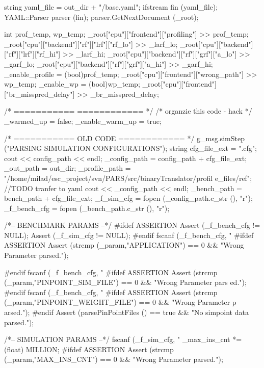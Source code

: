 \begin{DoxyCode}
                                                                     {
    string yaml_file = out_dir + "/base.yaml";
    ifstream fin (yaml_file);
    YAML::Parser parser (fin);
    parser.GetNextDocument (_root);


    int prof_temp, wp_temp;
    _root["cpu"]["frontend"]["profiling"] >> prof_temp;
    _root["cpu"]["backend"]["rf"]["lrf"]["rf_lo"] >> _larf_lo;
    _root["cpu"]["backend"]["rf"]["lrf"]["rf_hi"] >> _larf_hi;
    _root["cpu"]["backend"]["rf"]["grf"]["a_lo"]  >> _garf_lo;
    _root["cpu"]["backend"]["rf"]["grf"]["a_hi"]  >> _garf_hi;
    _enable_profile = (bool)prof_temp;
    _root["cpu"]["frontend"]["wrong_path"] >> wp_temp;
    _enable_wp = (bool)wp_temp;
    _root["cpu"]["frontend"]["br_misspred_delay"] >> _br_misspred_delay;


    /* =========== ============ */
    /* organzie this code  - hack */
    _warmed_up = false;
    _enable_warm_up = true;

    /* =========== OLD CODE ============ */
        g_msg.simStep ("PARSING SIMULATION CONFIGURATIONS");
    string cfg_file_ext = ".cfg";
    cout << config_path << endl;
    _config_path  = config_path + cfg_file_ext;
    _out_path = out_dir;
    _profile_path = "/home/milad/esc_project/svn/PARS/src/binaryTranslator/profil
      e_files/ref"; //TODO tranfer to yaml
    cout << _config_path << endl;
    _bench_path   = bench_path + cfg_file_ext;
        _f_sim_cfg    = fopen (_config_path.c_str (), "r");
        _f_bench_cfg  = fopen (_bench_path.c_str (), "r");

    /*-- BENCHMARK PARAMS --*/
        #ifdef ASSERTION
        Assert (_f_bench_cfg != NULL);
        Assert (_f_sim_cfg != NULL);
        #endif
        fscanf (_f_bench_cfg, "%
        #ifdef ASSERTION
        Assert (strcmp (_param,"APPLICATION") == 0 && "Wrong Parameter parsed.");
      
        #endif
        fscanf (_f_bench_cfg, "%
        #ifdef ASSERTION
        Assert (strcmp (_param,"PINPOINT_SIM_FILE") == 0 && "Wrong Parameter pars
      ed.");
        #endif
        fscanf (_f_bench_cfg, "%
        #ifdef ASSERTION
        Assert (strcmp (_param,"PINPOINT_WEIGHT_FILE") == 0 && "Wrong Parameter p
      arsed.");
        #endif
        Assert (parsePinPointFiles () == true && "No simpoint data parsed.");

    /*-- SIMULATION PARAMS --*/
        fscanf (_f_sim_cfg, "%
    _max_ins_cnt *= (float) MILLION;
        #ifdef ASSERTION
        Assert (strcmp (_param,"MAX_INS_CNT") == 0 && "Wrong Parameter parsed.");
      
}
\end{DoxyCode}
